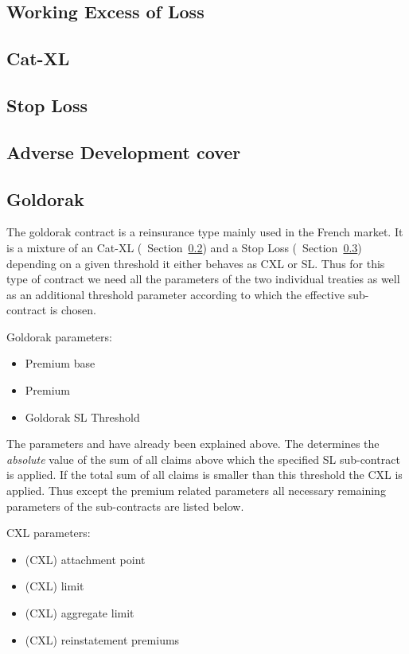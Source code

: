 \subsection{Working Excess of Loss}
\label{sec:WXL}

\subsection{Cat-XL}
\label{sec:CXL}

\subsection{Stop Loss}
\label{sec:SL}

\subsection{Adverse Development cover}
\label{sec:ADC}

\subsection{Goldorak}
\label{sec:goldorak}

The goldorak contract is a reinsurance type mainly used in the French market. It is a mixture of an Cat-XL (\cf~Section~\ref{sec:CXL}) and a Stop Loss (\cf~Section~\ref{sec:SL}) \ie depending on a given threshold it either behaves as CXL or SL. Thus for this type of contract we need all the parameters of the two individual treaties as well as an additional threshold parameter according to which the effective sub-contract is chosen.

Goldorak parameters:
\begin{itemize}
\item Premium base
\item Premium
\item Goldorak SL Threshold
\end{itemize}

The parameters  and  have already been explained above. The  determines the {\em absolute} value of the sum of all claims above which the specified SL sub-contract is applied. If the total sum of all claims is smaller than this threshold the CXL is applied. Thus except the premium related parameters all necessary remaining parameters of the sub-contracts are listed below.

CXL parameters:
\begin{itemize}
\item (CXL) attachment point
\item (CXL) limit
\item (CXL) aggregate limit
\item (CXL) reinstatement premiums
\end{itemize}

